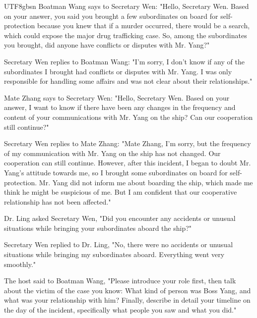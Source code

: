 \documentclass[11pt]{article}
\begin{document}
{\begin{CJK}{UTF8}{gbsn}
Boatman Wang says to Secretary Wen: "Hello, Secretary Wen. Based on your answer, you said you brought a few subordinates on board for self-protection because you knew that if a murder occurred, there would be a search, which could expose the major drug trafficking case. So, among the subordinates you brought, did anyone have conflicts or disputes with Mr. Yang?"

Secretary Wen replies to Boatman Wang: "I'm sorry, I don't know if any of the subordinates I brought had conflicts or disputes with Mr. Yang. I was only responsible for handling some affairs and was not clear about their relationships."

Mate Zhang says to Secretary Wen: "Hello, Secretary Wen. Based on your answer, I want to know if there have been any changes in the frequency and content of your communications with Mr. Yang on the ship? Can our cooperation still continue?"

Secretary Wen replies to Mate Zhang: "Mate Zhang, I'm sorry, but the frequency of my communication with Mr. Yang on the ship has not changed. Our cooperation can still continue. However, after this incident, I began to doubt Mr. Yang's attitude towards me, so I brought some subordinates on board for self-protection. Mr. Yang did not inform me about boarding the ship, which made me think he might be suspicious of me. But I am confident that our cooperative relationship has not been affected."

Dr. Ling asked Secretary Wen, "Did you encounter any accidents or unusual situations while bringing your subordinates aboard the ship?"

Secretary Wen replied to Dr. Ling, "No, there were no accidents or unusual situations while bringing my subordinates aboard. Everything went very smoothly."

The host said to Boatman Wang, "Please introduce your role first, then talk about the victim of the case you know: What kind of person was Boss Yang, and what was your relationship with him? Finally, describe in detail your timeline on the day of the incident, specifically what people you saw and what you did."



\end{CJK}}
\end{document}
